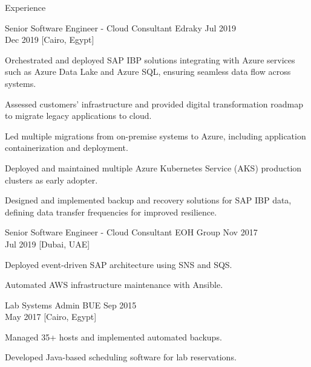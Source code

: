 \begin{rSection}{Experience}
    \begin{rSubsection}
        {Senior Software Engineer - Cloud Consultant}
        {Edraky}
        {Jul 2019 \\ Dec 2019}
        [Cairo, Egypt]
        \begin{rItemize}
            \item Orchestrated and deployed SAP IBP solutions integrating with Azure services such as Azure Data Lake and Azure SQL, ensuring seamless data flow across systems.
            \item Assessed customers' infrastructure and provided digital transformation roadmap to migrate legacy applications to cloud.
            \item Led multiple migrations from on-premise systems to Azure, including application containerization and deployment.
            \item Deployed and maintained multiple Azure Kubernetes Service (AKS) production clusters as early adopter.
            \item Designed and implemented backup and recovery solutions for SAP IBP data, defining data transfer frequencies for improved resilience.
        \end{rItemize}
    \end{rSubsection}

    \begin{rSubsection}
        {Senior Software Engineer - Cloud Consultant}
        {EOH Group}
        {Nov 2017 \\ Jul 2019}
        [Dubai, UAE]
        \begin{rItemize}
            \item Deployed event-driven SAP architecture using SNS and SQS.
            \item Automated AWS infrastructure maintenance with Ansible.
        \end{rItemize}
    \end{rSubsection}

    \begin{rSubsection}
        {Lab Systems Admin}
        {BUE}
        {Sep 2015 \\ May 2017}
        [Cairo, Egypt]
        \begin{rItemize}
            \item Managed 35+ hosts and implemented automated backups.
            \item Developed Java-based scheduling software for lab reservations.
        \end{rItemize}
    \end{rSubsection}


\end{rSection}

